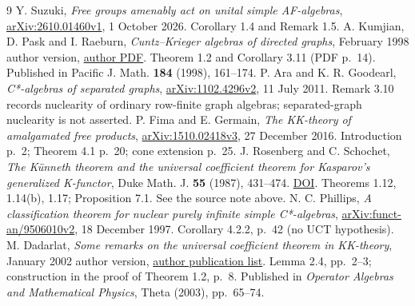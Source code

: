 \documentclass[11pt,letterpaper]{amsart}
\theoremstyle{remark}\newtheorem{remark}[theorem]{Remark}
\begin{document}
\begin{thebibliography}{9}
 Y. Suzuki, \emph{Free groups amenably act on unital simple
AF-algebras}, \href{https://arxiv.org/abs/2610.01460v1}{arXiv:2610.01460v1},
1 October 2026. Corollary 1.4 and Remark 1.5.
 A. Kumjian, D. Pask and I. Raeburn,
\emph{Cuntz--Krieger algebras of directed graphs}, February 1998 author
version, \href{https://documents.uow.edu.au/~dpask/index_files/papers/ckaodg.pdf}{author PDF}.
Theorem 1.2 and Corollary 3.11 (PDF p.~14). Published in Pacific J. Math.
\textbf{184} (1998), 161--174.
 P. Ara and K. R. Goodearl, \emph{C*-algebras of separated
graphs}, \href{https://arxiv.org/abs/1102.4296v2}{arXiv:1102.4296v2},
11 July 2011. Remark 3.10 records nuclearity of ordinary row-finite graph
algebras; separated-graph nuclearity is not asserted.
 P. Fima and E. Germain, \emph{The KK-theory of amalgamated
free products}, \href{https://arxiv.org/abs/1510.02418v3}{arXiv:1510.02418v3},
27 December 2016. Introduction p.~2; Theorem 4.1 p.~20; cone extension p.~25.
 J. Rosenberg and C. Schochet, \emph{The K\"unneth theorem
and the universal coefficient theorem for Kasparov's generalized K-functor},
Duke Math. J. \textbf{55} (1987), 431--474.
\href{https://doi.org/10.1215/S0012-7094-87-05524-4}{DOI}.
Theorems 1.12, 1.14(b), 1.17; Proposition 7.1. See the source note above.
 N. C. Phillips, \emph{A classification theorem for nuclear
purely infinite simple C*-algebras},
\href{https://arxiv.org/abs/funct-an/9506010v2}{arXiv:funct-an/9506010v2},
18 December 1997. Corollary 4.2.2, p.~42 (no UCT hypothesis).
 M. Dadarlat, \emph{Some remarks on the universal
coefficient theorem in KK-theory}, January 2002 author version,
\href{https://www.math.purdue.edu/~mdd/Papers.html}{author publication list}.
Lemma 2.4, pp.~2--3; construction in the proof of Theorem 1.2, p.~8.
Published in \emph{Operator Algebras and Mathematical Physics},
Theta (2003), pp.~65--74.
\end{thebibliography}
\end{document}
